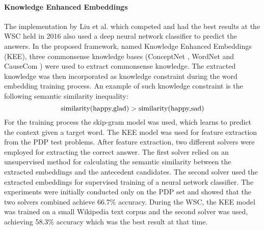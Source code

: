 \paragraph{Knowledge Enhanced Embeddings}
The implementation by Liu et al. \cite{DBLP:journals/corr/LiuJLZWH16} which competed and had the best results at the WSC held in 2016 also used a deep neural network classifier to predict the answers. In the proposed framework, named Knowledge Enhanced Embeddings (KEE), three commonsense knowledge bases (ConceptNet \cite{articleC}, WordNet \cite{DBLP:journals/cacm/Miller95} and CauseCom \cite{DBLP:journals/corr/Liu0LWH16}) were used to extract commonsense knowledge. The extracted knowledge was then incorporated as knowledge constraint during the word embedding training process. An example of such knowledge constraint is the following semantic similarity inequality: 
\begin{equation}\notag
	\text{similarity(happy,glad)} > \text{similarity(happy,sad)}
\end{equation}
 For the training process the skip-gram model \cite{DBLP:journals/corr/abs-1301-3781} was used, which learns to predict the context given a target word. The KEE model was used for feature extraction from the PDP test problems. After feature extraction, two different solvers were employed for extracting the correct answer. The first solver relied on an unsupervised method for calculating the semantic similarity between the extracted embeddings and the antecedent candidates. The second solver used the extracted embeddings for supervised training of a neural network classifier. The experiments were initially conducted only on the PDP set and showed that the two solvers combined achieve 66.7\% accuracy. During the WSC, the KEE model was trained on a small Wikipedia text corpus and the second solver was used, achieving 58.3\% accuracy which was the best result at that time. 

